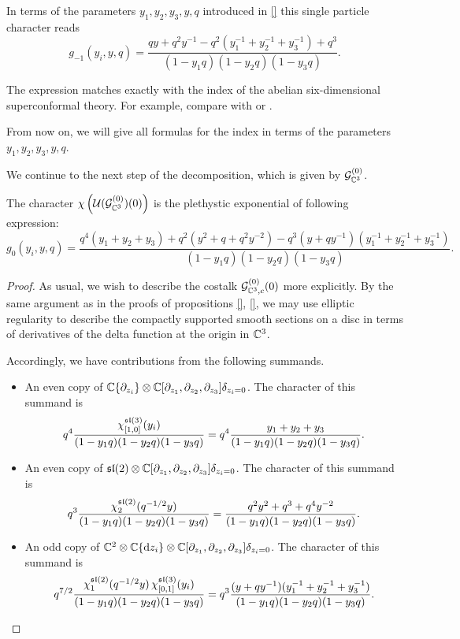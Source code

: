 In terms of the parameters $y_1,y_2,y_3,y,q$ introduced in \ref{} this single particle character reads
\begin{equation}
\label{eqn:6done1}
g_{-1} (y_i,y,q) = \frac{qy + q^2y^{-1} - q^2(y^{-1}_1+y^{-1}_2+y^{-1}_3) + q^3}{(1-y_1q) (1-y_2 q) (1-y_3 q)} .
\end{equation}

The expression matches exactly with the index of the abelian six-dimensional superconformal theory. For example, compare with \cite[Eq. (3.1)]{Kim:2013nva} or \cite[Eq. (3.35)]{Bhattacharya:2008zy}.

From now on, we will give all formulas for the index in terms of the parameters $y_1,y_2,y_3,y,q$.

\parsec[]
We continue to the next step of the decomposition, which is given by  $\mathcal{G}^{(0)}_{\mathbb{C}^3}$.

\begin{prop}
The character $\chi \left( \mathcal{U}(\mathcal{G}^{(0)} _{\mathbb{C}^3}) (0)\right )$  is the plethystic exponential of following expression:
\begin{equation}\label{eqn:6dtwo}
g_{0} (y_i,y,q) = \frac{q^4(y_1+y_2+y_3) + q^2 (y^2 + q + q^2 y^{-2}) - q^{3} (y + q y^{-1})(y_1^{-1} + y_2^{-1} + y_3^{-1})}{(1-y_1q) (1-y_2 q) (1-y_3 q)}.
\end{equation}
\end{prop}
\begin{proof}
As usual, we wish to describe the costalk $\mathcal{G}^{(0)}_{\mathbb{C}^3, c} (0)$  more explicitly. By the same argument as in the proofs of propositions \ref{}, \ref{}, we may use elliptic regularity to describe the compactly supported smooth sections on a disc in terms of derivatives of the delta function at the origin in $\mathbb{C}^3$. 

Accordingly, we have contributions from the following summands.
\begin{itemize}
\item An even copy of $\mathbb{C}\{\partial_{z_i} \} \otimes \mathbb{C}[\partial_{z_1}, \partial_{z_2}, \partial_{z_3}] \delta_{z_i=0}$. The character of this summand is
\[
q^4 \frac{\chi^{\mathfrak{sl}(3)}_{[1,0]}(y_i)}{(1-y_1q) (1-y_2 q) (1-y_3 q)}  = q^4 \frac{y_1 + y_2 + y_3}{(1-y_1q) (1-y_2 q) (1-y_3 q)}.
\]
\item An even copy of $\mathfrak{sl}(2) \otimes \mathbb{C}[\partial_{z_1}, \partial_{z_2}, \partial_{z_3}] \delta_{z_i=0}$. The character of this summand is
\[
q^3 \frac{\chi_2^{\mathfrak{sl}(2)} (q^{-1/2}y)}{(1-y_1q) (1-y_2 q) (1-y_3 q)}  = \frac{q^2 y^2 + q^3 + q^4 y^{-2}}{(1-y_1q) (1-y_2 q) (1-y_3 q)}.
\]
\item An odd copy of $\mathbb{C}^2\otimes \mathbb{C}\{\mathrm{d} z_i \} \otimes \mathbb{C}[\partial_{z_1}, \partial_{z_2}, \partial_{z_3}] \delta_{z_i=0}$. The character of this summand is 
\[
q^{7/2}\frac{\chi^{\mathfrak{sl}(2)}_{1}(q^{-1/2} y) \, \chi_{[0,1]}^{\mathfrak{sl}(3)} (y_i)}{(1-y_1q) (1-y_2 q) (1-y_3 q)} = q^{3}\frac{(y + q y^{-1})(y_1^{-1} + y_2^{-1} + y_3^{-1})}{(1-y_1q) (1-y_2 q) (1-y_3 q)} .
\]
\end{itemize}
\end{proof}

